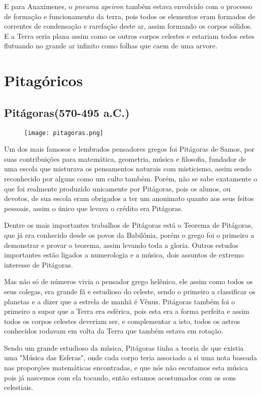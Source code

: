 E para Anaximenes, o {\it pneuma apeiron} também estava envolvido com o processo de formação e funcionamento da terra, pois todos os elementos eram formados de correntes de condensação e rarefação deste ar, assim formando os corpos sólidos. E a Terra seria plana assim como os outros corpos celestes e estariam todos estes flutuando no grande ar infinito como folhas que caem de uma arvore.

\section*{Pitagóricos}
\subsection*{Pitágoras(570-495 a.C.)}
\begin{figure}[!htb]
	\centering
	\texttt{[image: pitagoras.png]}
\end{figure}
Um dos mais famosos e lembrados pensadores gregos foi Pitágoras de Samos, por suas contribuições para matemática, geometria, música e filosofia, fundador de uma escola que misturava os pensamentos naturais com misticismo, assim sendo reconhecido por alguns como um culto também. Porém, não se sabe exatamente o que foi realmente produzido unicamente por Pitágoras, pois os alunos, ou devotos, de sua escola eram obrigados a ter um anonimato quanto aos seus feitos pessoais, assim o único que levava o crédito era Pitágoras.

Dentre os mais importantes trabalhos de Pitágoras está o Teorema de Pitágoras, que já era conhecido desde os povos da Babilônia, porém o grego foi o primeiro a demonstrar e provar o teorema, assim levando toda a gloria. Outros estudos importantes estão ligados a numerologia e a música, dois assuntos de extremo interesse de Pitágoras.

Mas não só de números vivia o pensador grego helênico, ele assim como todos os seus colegas, era grande fã e estudioso do celeste, sendo o primeiro a classificar os planetas e a dizer que a estrela de manhã é Vênus. Pitágoras também foi o primeiro a supor que a Terra era esférica, pois esta era a forma perfeita e assim todos os corpos celestes deveriam ser, e complementar a isto, todos os astros conhecidos rodavam em volta da Terra que também estava em rotação.

Sendo um grande estudioso da música, Pitágoras tinha a teoria de que existia uma "Música das Esferas", onde cada corpo teria associado a si uma nota baseada nas proporções matemáticas encontradas, e que nós não escutamos esta música pois já nascemos com ela tocando, então estamos acostumados com os sons celestiais.

